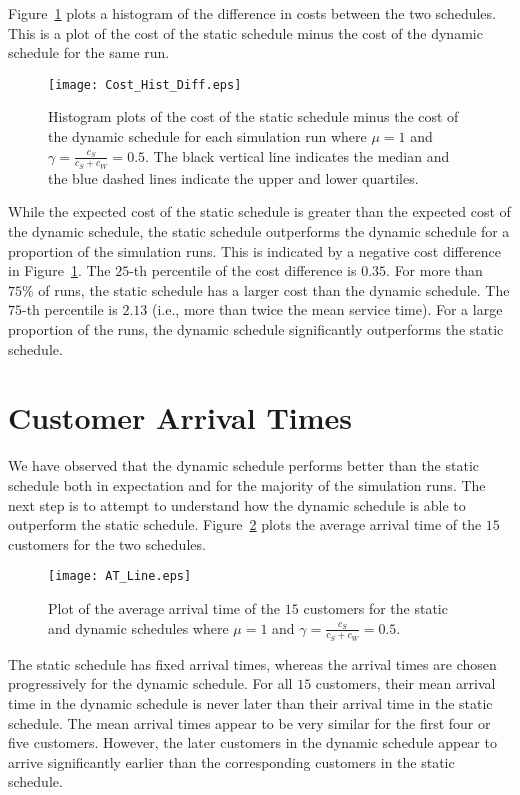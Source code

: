 Figure~\ref{fig:Diff_Cost} plots a histogram of the difference in costs between the two schedules. This is a plot of the cost of the static schedule minus the cost of the dynamic schedule for the same run.
\begin{figure}[htb]
	\centering
	\texttt{[image: Cost\_Hist\_Diff.eps]}
	\caption{Histogram plots of the cost of the static schedule minus the cost of the dynamic schedule for each simulation run where $\mu = 1$ and $\gamma = \frac{c_{S}}{c_{S} + c_{W}} = 0.5$. The black vertical line indicates the median and the blue dashed lines indicate the upper and lower quartiles.}
	\label{fig:Diff_Cost}
\end{figure}

While the expected cost of the static schedule is greater than the expected cost of the dynamic schedule, the static schedule outperforms the dynamic schedule for a proportion of the simulation runs. This is indicated by a negative cost difference in Figure~\ref{fig:Diff_Cost}. The $25$-th percentile of the cost difference is $0.35$. For more than $75 \%$ of runs, the static schedule has a larger cost than the dynamic schedule. The $75$-th percentile is $2.13$ (i.e., more than twice the mean service time). For a large proportion of the runs, the dynamic schedule significantly outperforms the static schedule.

\section{Customer Arrival Times}
We have observed that the dynamic schedule performs better than the static schedule both in expectation and for the majority of the simulation runs. The next step is to attempt to understand how the dynamic schedule is able to outperform the static schedule. Figure~\ref{fig:Avg_Arrival} plots the average arrival time of the $15$ customers for the two schedules.
\begin{figure}[htb]
	\centering
	\texttt{[image: AT\_Line.eps]}
	\caption{Plot of the average arrival time of the $15$ customers for the static and dynamic schedules where $\mu = 1$ and $\gamma = \frac{c_{S}}{c_{S} + c_{W}} = 0.5$.}
	\label{fig:Avg_Arrival}
\end{figure}

The static schedule has fixed arrival times, whereas the arrival times are chosen progressively for the dynamic schedule. For all $15$ customers, their mean arrival time in the dynamic schedule is never later than their arrival time in the static schedule. The mean arrival times appear to be very similar for the first four or five customers. However, the later customers in the dynamic schedule appear to arrive significantly earlier than the corresponding customers in the static schedule.

